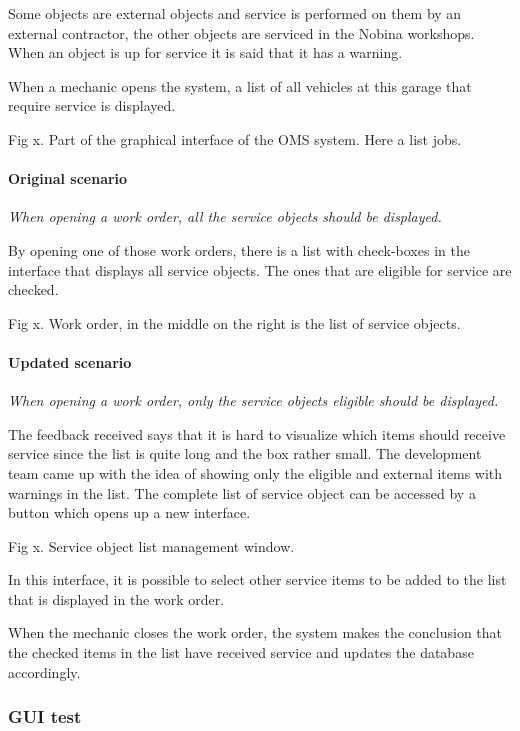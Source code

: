 \documentclass{article}
\begin{document}
		Some objects are external objects and service is performed on them by an external contractor, the other objects are serviced in the Nobina workshops. When an object is up for service it is said that it has a warning.

		When a mechanic opens the system, a list of all vehicles at this garage that require service is displayed.

		Fig x. Part of the graphical interface of the OMS system. Here a list jobs.

			\paragraph{Original scenario}
			{\em When opening a work order, all the service objects should be displayed.}

			By opening one of those work orders, there is a list with check-boxes in the interface that displays all service objects. The ones that are eligible for service are checked.

			Fig x. Work order, in the middle on the right is the list of service objects.

			\paragraph{Updated scenario}
			{\em When opening a work order, only the service objects eligible should be displayed.}

			The feedback received says that it is hard to visualize which items should receive service since the list is quite long and the box rather small. The development team came up with the idea of showing only the eligible and external items with warnings in the list. The complete list of service object can be accessed by a button which opens up a new interface.

			Fig x. Service object list management window.

			In this interface, it is possible to select other service items to be added to the list that is displayed in the work order.

			When the mechanic closes the work order, the system makes the conclusion that the checked items in the list have received service and updates the database accordingly.


			\subsubsection{GUI test}
\end{document}
